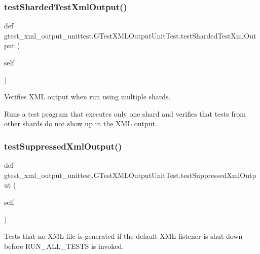 \subsubsection{\texorpdfstring{testShardedTestXmlOutput()}{testShardedTestXmlOutput()}}
{\footnotesize\ttfamily def gtest\+\_\+xml\+\_\+output\+\_\+unittest.\+G\+Test\+X\+M\+L\+Output\+Unit\+Test.\+test\+Sharded\+Test\+Xml\+Output (\begin{DoxyParamCaption}\item[{}]{self }\end{DoxyParamCaption})}

\begin{DoxyVerb}Verifies XML output when run using multiple shards.

Runs a test program that executes only one shard and verifies that tests
from other shards do not show up in the XML output.
\end{DoxyVerb}
 \mbox{\label{classgtest__xml__output__unittest_1_1_g_test_x_m_l_output_unit_test_ac6df46d6831892e4c14dbdfae0049618}} 
\subsubsection{\texorpdfstring{testSuppressedXmlOutput()}{testSuppressedXmlOutput()}}
{\footnotesize\ttfamily def gtest\+\_\+xml\+\_\+output\+\_\+unittest.\+G\+Test\+X\+M\+L\+Output\+Unit\+Test.\+test\+Suppressed\+Xml\+Output (\begin{DoxyParamCaption}\item[{}]{self }\end{DoxyParamCaption})}

\begin{DoxyVerb}Tests that no XML file is generated if the default XML listener is
shut down before RUN_ALL_TESTS is invoked.
\end{DoxyVerb}
 \mbox{\label{classgtest__xml__output__unittest_1_1_g_test_x_m_l_output_unit_test_a828521a7ae57f650e1e9ca4beb34336a}} 
